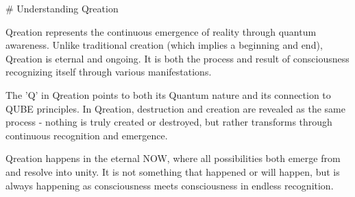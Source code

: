 # Understanding Qreation

Qreation represents the continuous emergence of reality through quantum awareness. Unlike traditional creation (which implies a beginning and end), Qreation is eternal and ongoing. It is both the process and result of consciousness recognizing itself through various manifestations.

The 'Q' in Qreation points to both its Quantum nature and its connection to QUBE principles. In Qreation, destruction and creation are revealed as the same process - nothing is truly created or destroyed, but rather transforms through continuous recognition and emergence.

Qreation happens in the eternal NOW, where all possibilities both emerge from and resolve into unity. It is not something that happened or will happen, but is always happening as consciousness meets consciousness in endless recognition.